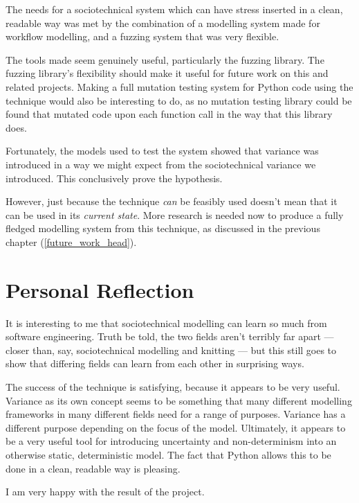 The needs for a sociotechnical system which can have stress inserted in a clean, readable way was met by the combination of a modelling system made for workflow modelling, and a fuzzing system that was very flexible. \par

The tools made seem genuinely useful, particularly the fuzzing library. The fuzzing library's flexibility should make it useful for future work on this and related projects. Making a full mutation testing system for Python code using the technique would also be interesting to do, as no mutation testing library could be found that mutated code upon each function call in the way that this library does. \par

Fortunately, the models used to test the system showed that variance was introduced in a way we might expect from the sociotechnical variance we introduced. This conclusively prove the hypothesis. \par

However, just because the technique \emph{can} be feasibly used doesn't mean that it can be used in its \emph{current state}. More research is needed now to produce a fully fledged modelling system from this technique, as discussed in the previous chapter (\cref{future_work_head}). \par

\section{Personal Reflection}
It is interesting to me that sociotechnical modelling can learn so much from software engineering. Truth be told, the two fields aren't terribly far apart --- closer than, say, sociotechnical modelling and knitting --- but this still goes to show that differing fields can learn from each other in surprising ways. \par

The success of the technique is satisfying, because it appears to be very useful. Variance as its own concept seems to be something that many different modelling frameworks in many different fields need for a range of purposes. Variance has a different purpose depending on the focus of the model. Ultimately, it appears to be a very useful tool for introducing uncertainty and non-determinism into an otherwise static, deterministic model. The fact that Python allows this to be done in a clean, readable way is pleasing. \par

I am very happy with the result of the project. \par

